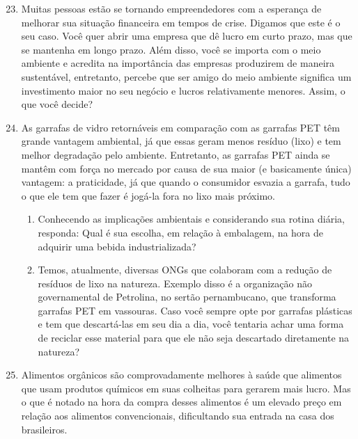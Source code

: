 \begin{enumerate}\setcounter{enumi}{22}

\item Muitas pessoas estão se tornando empreendedores com a esperança de melhorar sua situação financeira em tempos de crise. Digamos que este é o seu caso. Você quer abrir uma empresa que dê lucro em curto prazo, mas que se mantenha em longo prazo. Além disso, você se importa com o meio ambiente e acredita na importância das empresas produzirem de maneira sustentável, entretanto, percebe que ser amigo do meio ambiente significa um investimento maior no seu negócio e lucros relativamente menores. Assim, o que você decide?


\item As garrafas de vidro retornáveis em comparação com as garrafas PET têm grande vantagem ambiental, já que essas geram menos resíduo (lixo) e tem melhor degradação pelo ambiente. Entretanto, as garrafas PET ainda se mantêm com força no mercado por causa de sua maior (e basicamente única) vantagem: a praticidade, já que quando o consumidor esvazia a garrafa, tudo o que ele tem que fazer é jogá-la fora no lixo mais próximo.
  \begin{enumerate}
  \item Conhecendo as implicações ambientais e considerando sua rotina diária, responda: Qual é sua escolha, em relação à embalagem, na hora de adquirir uma bebida industrializada?
  \item Temos, atualmente, diversas ONGs que colaboram com a redução de resíduos de lixo na natureza. Exemplo disso é a organização não governamental de Petrolina, no sertão pernambucano, que transforma garrafas PET em vassouras. Caso você sempre opte por garrafas plásticas e tem que descartá-las em seu dia a dia, você tentaria achar uma forma de reciclar esse material para que ele não seja descartado diretamente na natureza?
  \end{enumerate}

\item Alimentos orgânicos são comprovadamente melhores à saúde que alimentos que usam produtos químicos em suas colheitas para gerarem mais lucro. Mas o que é notado na hora da compra desses alimentos é um elevado preço em relação aos alimentos convencionais, dificultando sua entrada na casa dos brasileiros.


\end{enumerate}

